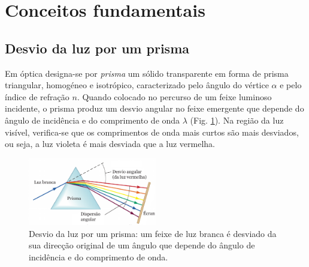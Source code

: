 \documentclass[12pt,a4paper,oneside]{paper}
\begin{document}
\pagestyle{fancy}
\fancyhf{} %

%
% 



\def\title {}


%
% 

 
\normalsize
\cleardoublepage
\setcounter{page}{1}
\selectfont
%
%

\printindex


\section{\sf Conceitos fundamentais}
\subsection{\sf Desvio da luz por um prisma}
Em óptica designa-se por \emph{prisma} um sólido transparente em forma de prisma triangular, homogéneo e isotrópico,
caracterizado pelo ângulo do vértice $\alpha$ e pelo índice de refração $n$. Quando colocado no percurso de um feixe luminoso
incidente, o prisma produz um desvio angular no feixe emergente que depende do ângulo de incidência e do comprimento de onda
$\lambda$ (Fig. \ref{fig:prisma1}). Na região da luz visível, verifica-se que os comprimentos de onda mais curtos são mais
desviados, ou seja, a luz violeta é mais desviada que a luz vermelha.

\begin{figure}[htb]  \centering 
	\includegraphics[width=0.5\textwidth]{./planck_images/prisma1.pdf}
	\caption{Desvio da luz por um prisma: um feixe de luz branca é desviado da sua direcção original de um ângulo que
	depende do ângulo de incidência e do comprimento de onda. \label{fig:prisma1}} 
\end{figure}
\end{document}
